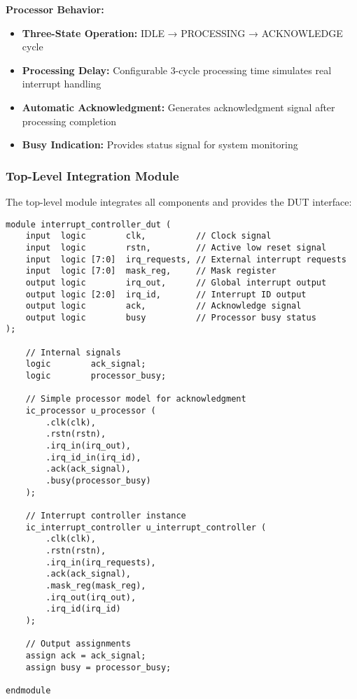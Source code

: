 \documentclass[12pt,a4paper]{article}
\begin{document}
\textbf{Processor Behavior:}
\begin{itemize}
    \item \textbf{Three-State Operation:} IDLE → PROCESSING → ACKNOWLEDGE cycle
    \item \textbf{Processing Delay:} Configurable 3-cycle processing time simulates real interrupt handling
    \item \textbf{Automatic Acknowledgment:} Generates acknowledgment signal after processing completion
    \item \textbf{Busy Indication:} Provides status signal for system monitoring
\end{itemize}

\subsubsection{Top-Level Integration Module}
The top-level module integrates all components and provides the DUT interface:

\begin{lstlisting}[caption=Top-Level DUT Integration, label=lst:dut_top]
module interrupt_controller_dut (
    input  logic        clk,          // Clock signal
    input  logic        rstn,         // Active low reset signal
    input  logic [7:0]  irq_requests, // External interrupt requests
    input  logic [7:0]  mask_reg,     // Mask register
    output logic        irq_out,      // Global interrupt output
    output logic [2:0]  irq_id,       // Interrupt ID output
    output logic        ack,          // Acknowledge signal
    output logic        busy          // Processor busy status
);

    // Internal signals
    logic        ack_signal;
    logic        processor_busy;

    // Simple processor model for acknowledgment
    ic_processor u_processor (
        .clk(clk),
        .rstn(rstn),
        .irq_in(irq_out),
        .irq_id_in(irq_id),
        .ack(ack_signal),
        .busy(processor_busy)
    );

    // Interrupt controller instance
    ic_interrupt_controller u_interrupt_controller (
        .clk(clk),
        .rstn(rstn),
        .irq_in(irq_requests),
        .ack(ack_signal),
        .mask_reg(mask_reg),
        .irq_out(irq_out),
        .irq_id(irq_id)
    );

    // Output assignments
    assign ack = ack_signal;
    assign busy = processor_busy;

endmodule
\end{lstlisting}
\end{document}
